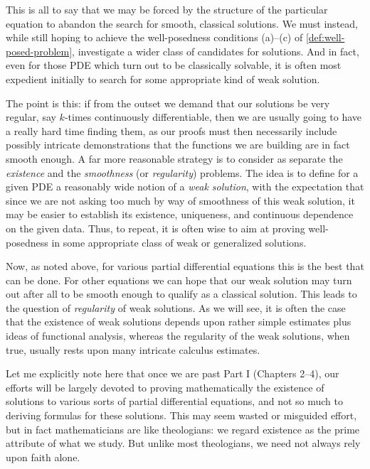 This is all to say that we may be forced by the structure of the particular equation to abandon the search for smooth, classical solutions. We must instead, while still hoping to achieve the well-posedness conditions (a)--(c) of \cref{def:well-posed-problem}, investigate a wider class of candidates for solutions. And in fact, even for those PDE which turn out to be classically solvable, it is often most expedient initially to search for some appropriate kind of weak solution.

The point is this: if from the outset we demand that our solutions be very regular, say $k$-times continuously differentiable, then we are usually going to have a really hard time finding them, as our proofs must then necessarily include possibly intricate demonstrations that the functions we are building are in fact smooth enough. A far more reasonable strategy is to consider as separate the \textit{existence} and the \textit{smoothness} (or \textit{regularity}) problems. The idea is to define for a given PDE a reasonably wide notion of a \textit{weak solution}, with the expectation that since we are not asking too much by way of smoothness of this weak solution, it may be easier to establish its existence, uniqueness, and continuous dependence on the given data. Thus, to repeat, it is often wise to aim at proving well-posedness in some appropriate class of weak or generalized solutions.

Now, as noted above, for various partial differential equations this is the best that can be done. For other equations we can hope that our weak solution may turn out after all to be smooth enough to qualify as a classical solution. This leads to the question of \textit{regularity} of weak solutions. As we will see, it is often the case that the existence of weak solutions depends upon rather simple estimates plus ideas of functional analysis, whereas the regularity of the weak solutions, when true, usually rests upon many intricate calculus estimates.

Let me explicitly note here that once we are past Part I (Chapters 2--4), our efforts will be largely devoted to proving mathematically the existence of solutions to various sorts of partial differential equations, and not so much to deriving formulas for these solutions. This may seem wasted or misguided effort, but in fact mathematicians are like theologians: we regard existence as the prime attribute of what we study. But unlike most theologians, we need not always rely upon faith alone.

